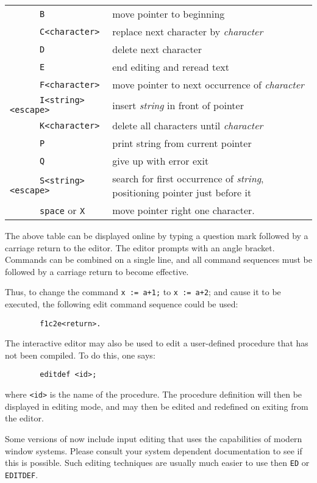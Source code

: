 \begin{tabular}{lp{\rboxwidth}}
{\tt~~~~~  B} & move pointer to beginning \\
{\tt~~~~~  C<character>} & replace next character by
{\em character} \\
{\tt~~~~~  D} & delete next character \\
{\tt~~~~~  E} & end editing and reread text \\
{\tt~~~~~  F<character>} & move pointer to next
occurrence of {\em character} \\[1.7pt]
{\tt~~~~~  I<string><escape>} &
 insert {\em string\/} in front of pointer \\
{\tt~~~~~  K<character>} & delete all characters
 until {\em character} \\
{\tt~~~~~  P} & print string from current pointer \\
{\tt~~~~~  Q} & give up with error exit \\
{\tt~~~~~  S<string><escape>} &
 search for first occurrence of {\em string},
                             positioning pointer just before it \\
{\tt~~~~~  space} or {\tt X} & move pointer right
one character.
\end{tabular}

The above table can be displayed online by typing a question mark followed
by a carriage return to the editor. The editor prompts with an angle
bracket. Commands can be combined on a single line, and all command
sequences must be followed by a carriage return to become effective.

Thus, to change the command {\tt x := a+1;} to {\tt x := a+2}; and cause
it to be executed, the following edit command sequence could be used:
\begin{verbatim}
        f1c2e<return>.
\end{verbatim}
\hypertarget{command:EDITDEF}{}
The interactive editor may also be used to edit a user-defined procedure that
has not been compiled.  To do this, one says:
\begin{verbatim}
        editdef <id>;
\end{verbatim}
where {\tt <id>} is the name of the procedure.  The procedure definition
will then be displayed in editing mode, and may then be edited and
redefined on exiting from the editor.

Some versions of {\REDUCE} now include input editing that uses the
capabilities of modern window systems.  Please consult your system
dependent documentation to see if this is possible.  Such editing
techniques are usually much easier to use then {\tt ED} or {\tt EDITDEF}.

